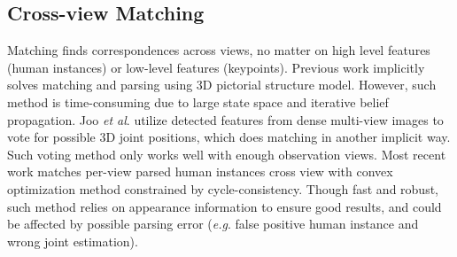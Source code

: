 \documentclass[10pt,twocolumn,letterpaper]{article}
\begin{document}
\subsection{Cross-view Matching}
Matching finds correspondences across views, no matter on high level features (human instances) or low-level features (keypoints). Previous work \cite{belagiannis20143d,belagiannis2014temporal3DPS,belagiannis20163dps,ershadi2018multiple} implicitly solves matching and parsing using 3D pictorial structure model. However, such method is time-consuming due to large state space and iterative belief propagation. Joo \emph{et al}. \cite{joo2019panoptic} utilize detected features from dense multi-view images to vote for possible 3D joint positions, which does matching in another implicit way. Such voting method only works well with enough observation views. Most recent work \cite{dong2019fast} matches per-view parsed human instances cross view with convex optimization method constrained by cycle-consistency. Though fast and robust, such method relies on appearance information to ensure good results, and could be affected by possible parsing error (\emph{e.g}. false positive human instance and wrong joint estimation).
\end{document}

